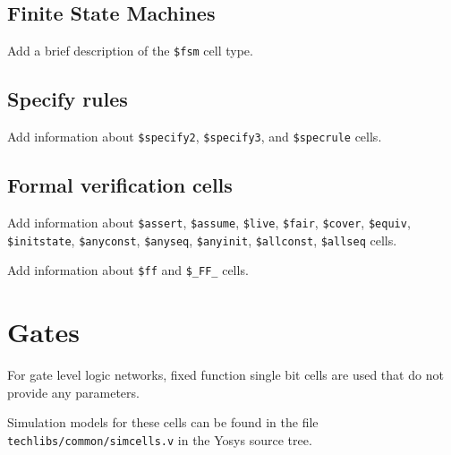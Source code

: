 \subsection{Finite State Machines}

\begin{fixme}
Add a brief description of the {\tt \$fsm} cell type.
\end{fixme}

\subsection{Specify rules}

\begin{fixme}
Add information about {\tt \$specify2}, {\tt \$specify3}, and {\tt \$specrule} cells.
\end{fixme}

\subsection{Formal verification cells}

\begin{fixme}
Add information about {\tt \$assert}, {\tt \$assume}, {\tt \$live}, {\tt \$fair}, {\tt \$cover}, {\tt \$equiv},
{\tt \$initstate}, {\tt \$anyconst}, {\tt \$anyseq}, {\tt \$anyinit}, {\tt \$allconst}, {\tt \$allseq} cells.
\end{fixme}

\begin{fixme}
Add information about {\tt \$ff} and {\tt \$\_FF\_} cells.
\end{fixme}

\section{Gates}
\label{sec:celllib_gates}

For gate level logic networks, fixed function single bit cells are used that do
not provide any parameters.

Simulation models for these cells can be found in the file {\tt techlibs/common/simcells.v} in the Yosys
source tree.

